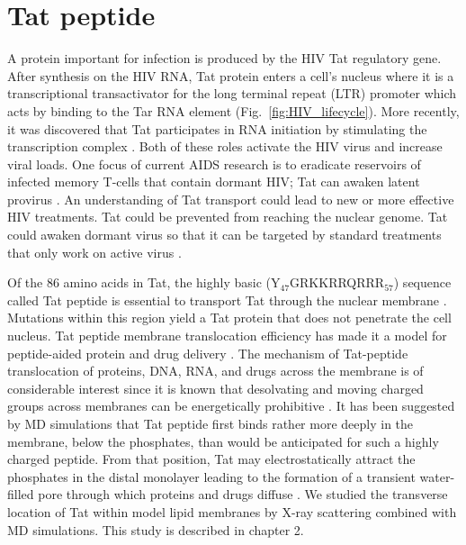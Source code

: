 \section{Tat peptide}
A protein important for infection is produced by the HIV Tat regulatory gene.
After synthesis on the HIV RNA, Tat protein enters a cell's nucleus where it is a
transcriptional transactivator for the long terminal repeat (LTR)
promoter which acts by binding to the Tar RNA element \cite{Vaishnav91}
(Fig.~\ref{fig:HIV_lifecycle}).
More recently, it was discovered that Tat participates in RNA
initiation by stimulating the transcription complex \cite{Raha05}.
Both of these roles activate the HIV virus and increase viral loads.
One focus of current AIDS research is to eradicate reservoirs of 
infected memory T-cells that contain dormant HIV;
Tat can awaken latent provirus \cite{Macias09}.
An understanding of Tat transport could lead to new or more effective 
HIV treatments. Tat could be prevented from
reaching the nuclear genome. Tat could awaken dormant virus so that
it can be targeted by standard treatments that only
work on active virus \cite{Macias09}. 

Of the 86 amino acids in Tat,
the highly basic (Y$_{47}$GRKKRRQRRR$_{57}$) sequence called Tat peptide 
is essential to transport
Tat through the nuclear membrane \cite{Ruben89,Hauber87}. 
Mutations within
this region yield a Tat protein that does not penetrate the cell 
nucleus. Tat peptide membrane translocation efficiency 
has made it a model for peptide-aided protein and drug delivery
\cite{Futaki01}. 
The mechanism of Tat-peptide translocation of proteins, 
DNA, RNA, and drugs across the membrane is of considerable interest
since it is known that desolvating and moving charged groups across membranes
can be energetically prohibitive \cite{Grabe04}. 
It has been suggested by MD simulations that Tat peptide first binds rather
more deeply in the membrane, below the phosphates, than
would be anticipated for such a highly charged peptide. From that position,
Tat may electrostatically attract the phosphates in the distal monolayer
leading to the formation of a transient water-filled pore through which
proteins and drugs diffuse \cite{Herce07}. 
We studied the transverse location of Tat within model lipid membranes 
by X-ray scattering
combined with MD simulations. This study is described in chapter 2.

